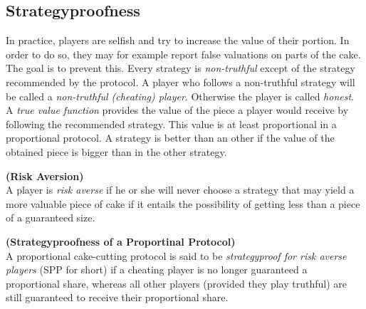 \subsection{Strategyproofness}
In practice, players are selfish and try to increase the value of their portion. In order to do so, they may for example report false valuations on parts of the cake.\\ The goal is to prevent this.
Every strategy is \emph{non-truthful} except of the strategy recommended by the protocol. A player who follows a non-truthful strategy will be called a \emph{non-truthful (cheating) player}. Otherwise the player is called \emph{honest}.\\
A \emph{true value function} provides the value of the piece a player would receive by following the recommended strategy. This value is at least proportional in a proportional protocol. A strategy is better than an other if the value of the obtained piece is bigger than in the other strategy.
\begin{defi}{\textbf{(Risk Aversion\cite{brams})}}\\
A player is \emph{risk averse} if he or she will never choose a strategy that may yield a more valuable piece of cake if it entails the possibility of getting less than a piece of a guaranteed size.
\end{defi}
\begin{defi}{\textbf{(Strategyproofness of a Proportinal Protocol\cite{lindner:degrees})}}\\
A proportional cake-cutting protocol is said to be \emph{strategyproof for risk averse players} (SPP for short) if a cheating player is no longer guaranteed a proportional share, whereas all other players (provided they play truthful) are still guaranteed to receive their proportional share.
\end{defi}

